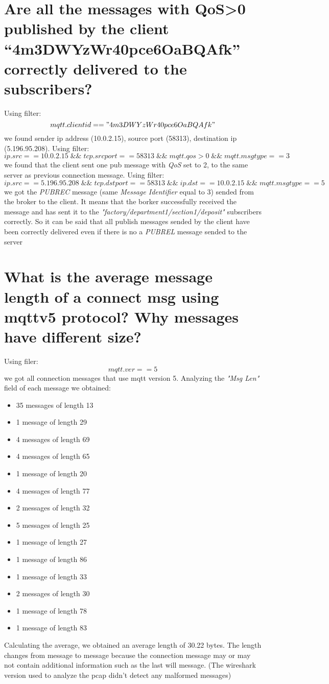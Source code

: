 \documentclass{article}
\begin{document}
\section{Are all the messages with QoS\textgreater  0 published by the
client \break“4m3DWYzWr40pce6OaBQAfk” correctly delivered
to the subscribers?}
Using filter: \[ mqtt.clientid == "4m3DWYzWr40pce6OaBQAfk"\] we found sender ip address (10.0.2.15), source port (58313), destination ip (5.196.95.208). \hfill \break
Using filter: \[ ip.src == 10.0.2.15 \; \&\& \; tcp.srcport == 58313 \; \&\& \; mqtt.qos > 0\; \&\& \; mqtt.msgtype == 3\] we found that the client sent one pub message with \textit{QoS} set to 2, to the same server as previous connection message. \hfill \break
Using filter: \[ ip.src == 5.196.95.208 \; \&\& \; tcp.dstport == 58313 \; \&\& \; ip.dst == 10.0.2.15 \; \&\& \; mqtt.msgtype == 5\] we got the \textit{PUBREC} message (same \textit{Message Identifier} equal to 3) sended from the broker to the client. \hfill \break
It means that the borker successfully received the message and has sent it to the \textit{"factory/department1/section1/deposit"} subscribers correctly. So it can be said that all publish messages sended by the client have been correctly delivered even if there is no a \textit{PUBREL} message sended to the server 


\section{What is the average message length of a connect msg
using mqttv5 protocol? Why messages have different
size?}
Using filer: \[ mqtt.ver == 5\] we got all connection messages that use mqtt version 5. \hfill \break
Analyzing the \textit{"Msg Len"} field of each message we obtained: 
\begin{itemize} 
   \item 35 messages of length 13
   \item 1 message of length 29
   \item 4 messages of length 69
   \item 4 messages of length 65
   \item 1 message of length 20
   \item 4 messages of length 77
   \item 2 messages of length 32
   \item 5 messages of length 25
   \item 1 message of length 27
   \item 1 message of length 86
   \item 1 message of length 33
   \item 2 messages of length 30
   \item 1 message of length 78
   \item 1 message of length 83
\end{itemize}
Calculating the average, we obtained an average length of 30.22 bytes. \hfill \break
The length changes from message to message because the connection message may or may not contain additional information such as the last will message. \hfill \break
(The wireshark version used to analyze the pcap didn't detect any malformed messages)
\end{document}
